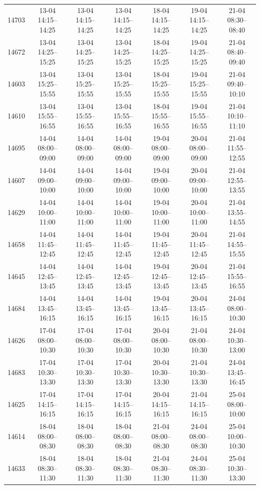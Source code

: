 \begin{table}[htbp]
\begin{tabular}{|r|c|c|c|c|c|c|}
14703 & 13-04 14:15--14:25 & 13-04 14:15--14:25 & 13-04 14:15--14:25 & 18-04 14:15--14:25 & 19-04 14:15--14:25 & 21-04 08:30--08:40 \\ 
14672 & 13-04 14:25--15:25 & 13-04 14:25--15:25 & 13-04 14:25--15:25 & 18-04 14:25--15:25 & 19-04 14:25--15:25 & 21-04 08:40--09:40 \\ 
14603 & 13-04 15:25--15:55 & 13-04 15:25--15:55 & 13-04 15:25--15:55 & 18-04 15:25--15:55 & 19-04 15:25--15:55 & 21-04 09:40--10:10 \\ 
14610 & 13-04 15:55--16:55 & 13-04 15:55--16:55 & 13-04 15:55--16:55 & 18-04 15:55--16:55 & 19-04 15:55--16:55 & 21-04 10:10--11:10 \\ 
14695 & 14-04 08:00--09:00 & 14-04 08:00--09:00 & 14-04 08:00--09:00 & 19-04 08:00--09:00 & 20-04 08:00--09:00 & 21-04 11:55--12:55 \\ 
14607 & 14-04 09:00--10:00 & 14-04 09:00--10:00 & 14-04 09:00--10:00 & 19-04 09:00--10:00 & 20-04 09:00--10:00 & 21-04 12:55--13:55 \\ 
14629 & 14-04 10:00--11:00 & 14-04 10:00--11:00 & 14-04 10:00--11:00 & 19-04 10:00--11:00 & 20-04 10:00--11:00 & 21-04 13:55--14:55 \\ 
14658 & 14-04 11:45--12:45 & 14-04 11:45--12:45 & 14-04 11:45--12:45 & 19-04 11:45--12:45 & 20-04 11:45--12:45 & 21-04 14:55--15:55 \\ 
14645 & 14-04 12:45--13:45 & 14-04 12:45--13:45 & 14-04 12:45--13:45 & 19-04 12:45--13:45 & 20-04 12:45--13:45 & 21-04 15:55--16:55 \\ 
14684 & 14-04 13:45--16:15 & 14-04 13:45--16:15 & 14-04 13:45--16:15 & 19-04 13:45--16:15 & 20-04 13:45--16:15 & 24-04 08:00--10:30 \\ 
14626 & 17-04 08:00--10:30 & 17-04 08:00--10:30 & 17-04 08:00--10:30 & 20-04 08:00--10:30 & 21-04 08:00--10:30 & 24-04 10:30--13:00 \\ 
14683 & 17-04 10:30--13:30 & 17-04 10:30--13:30 & 17-04 10:30--13:30 & 20-04 10:30--13:30 & 21-04 10:30--13:30 & 24-04 13:45--16:45 \\ 
14625 & 17-04 14:15--16:15 & 17-04 14:15--16:15 & 17-04 14:15--16:15 & 20-04 14:15--16:15 & 21-04 14:15--16:15 & 25-04 08:00--10:00 \\ 
14614 & 18-04 08:00--08:30 & 18-04 08:00--08:30 & 18-04 08:00--08:30 & 21-04 08:00--08:30 & 24-04 08:00--08:30 & 25-04 10:00--10:30 \\ 
14633 & 18-04 08:30--11:30 & 18-04 08:30--11:30 & 18-04 08:30--11:30 & 21-04 08:30--11:30 & 24-04 08:30--11:30 & 25-04 10:30--13:30 \\ 

\end{tabular}
\end{table}
